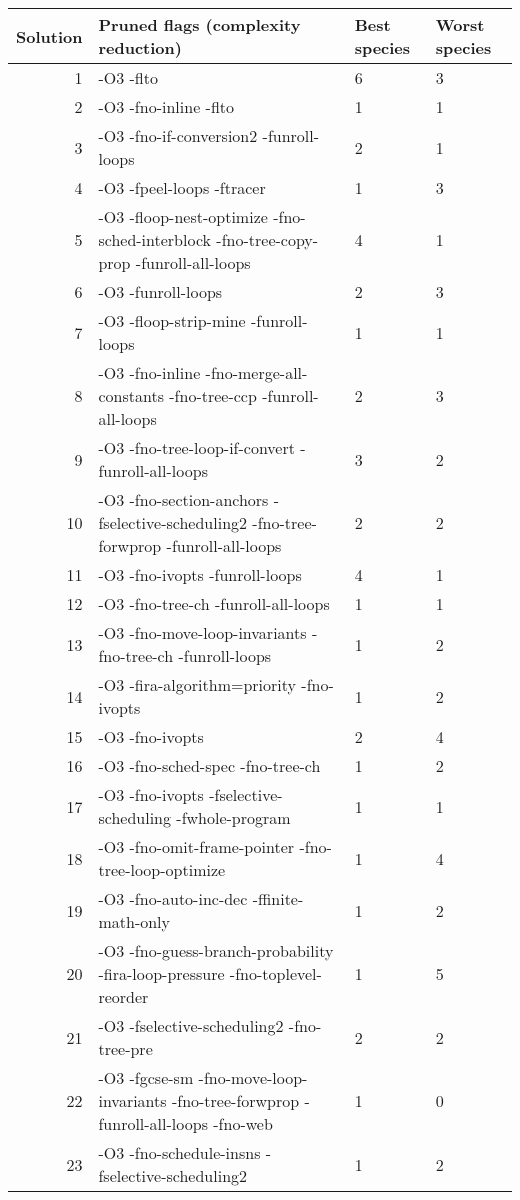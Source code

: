     \begin{tabular}{|r|p{4.5in}|p{0.5in}|p{0.5in}|}
     \hline
     \textbf{Solution} & \textbf{Pruned flags (complexity reduction)} & \textbf{Best species} & \textbf{Worst species} \\ 
     \hline
      1 & -O3 -flto & 6 & 3 \\
     \hline
      2 & -O3 -fno-inline -flto & 1 & 1 \\
     \hline
      3 & -O3 -fno-if-conversion2 -funroll-loops & 2 & 1 \\
     \hline
      4 & -O3 -fpeel-loops -ftracer & 1 & 3 \\
     \hline
      5 & -O3 -floop-nest-optimize -fno-sched-interblock -fno-tree-copy-prop -funroll-all-loops & 4 & 1 \\
     \hline
      6 & -O3 -funroll-loops & 2 & 3 \\
     \hline
      7 & -O3 -floop-strip-mine -funroll-loops & 1 & 1 \\
     \hline
      8 & -O3 -fno-inline -fno-merge-all-constants -fno-tree-ccp -funroll-all-loops & 2 & 3 \\
     \hline
      9 & -O3 -fno-tree-loop-if-convert -funroll-all-loops & 3 & 2 \\
     \hline
      10 & -O3 -fno-section-anchors -fselective-scheduling2 -fno-tree-forwprop -funroll-all-loops & 2 & 2 \\
     \hline
      11 & -O3 -fno-ivopts -funroll-loops & 4 & 1 \\
     \hline
      12 & -O3 -fno-tree-ch -funroll-all-loops & 1 & 1 \\
     \hline
      13 & -O3 -fno-move-loop-invariants -fno-tree-ch -funroll-loops & 1 & 2 \\
     \hline
      14 & -O3 -fira-algorithm=priority -fno-ivopts & 1 & 2 \\
     \hline
      15 & -O3 -fno-ivopts & 2 & 4 \\
     \hline
      16 & -O3 -fno-sched-spec -fno-tree-ch & 1 & 2 \\
     \hline
      17 & -O3 -fno-ivopts -fselective-scheduling -fwhole-program & 1 & 1 \\
     \hline
      18 & -O3 -fno-omit-frame-pointer -fno-tree-loop-optimize & 1 & 4 \\
     \hline
      19 & -O3 -fno-auto-inc-dec -ffinite-math-only & 1 & 2 \\
     \hline
      20 & -O3 -fno-guess-branch-probability -fira-loop-pressure -fno-toplevel-reorder & 1 & 5 \\
     \hline
      21 & -O3 -fselective-scheduling2 -fno-tree-pre & 2 & 2 \\
     \hline
      22 & -O3 -fgcse-sm -fno-move-loop-invariants -fno-tree-forwprop -funroll-all-loops -fno-web & 1 & 0 \\
     \hline
      23 & -O3 -fno-schedule-insns -fselective-scheduling2 & 1 & 2 \\
     \hline
    \end{tabular}